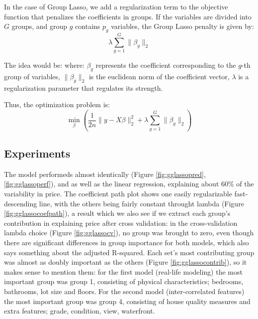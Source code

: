 \documentclass[a4paper, 11pt]{article}
\begin{document}
\begin{multicols}{2}
{In the case of Group Lasso, we add a regularization term to the objective function that penalizes the coefficients in groups. If the variables are divided into $G$ groups, and group $g$ contains $p_{g}$ variables, the Group Lasso penalty is given by: \begin{equation} \lambda \sum_{g=1}^{G}\lVert \beta_{g} \rVert_{2}
\end{equation}

The idea would be: where: $\beta_g$ represents the coefficient corresponding to the $g$-th group of variables, $\lVert \beta_g \rVert_2$ is the euclidean norm of the coefficient vector, $\lambda$ is a regularization parameter that regulates its strength.

Thus, the optimization problem is: \begin{equation}
\min_{\beta}\left (\frac{1}{2n}\lVert y-X\beta\rVert^{2}_{2} + \lambda \sum_{g=1}^{G}\lVert \beta_{g} \rVert_{2}\right)
\end{equation}

\subsection{Experiments} \vspace{-3pt}
The model performeds almost identically (Figure \ref{fig:gglassopred}, \ref{fig:gglassoperf}), and as well as the linear regression, explaining about 60\% of the variability in price. The coefficient path plot shows one easily regularizable fast-descending line, with the others being fairly constant throught lambda (Figure \ref{fig:gglassocoefpath}), a result which we also see if we extract each group's contribution in explaining price after cross validation: in the cross-validation lambda choice (Figure \ref{fig:gglassocv}), no group was brought to zero, even though there are significant differences in group importance for both models, which also says something about the adjusted R-squared.
Each set's most contributing group was almost as doubly important as the others (Figure \ref{fig:gglassocontrib}), so it makes sense to mention them: for the first model (real-life modeling) the most important group was group 1, consisting of physical characteristics; bedrooms, bathrooms, lot size and floors. For the second model (inter-correlated features) the most important group was group 4, consisting of house quality measures and extra features; grade, condition, view, waterfront.

}
\end{multicols}
\end{document}
